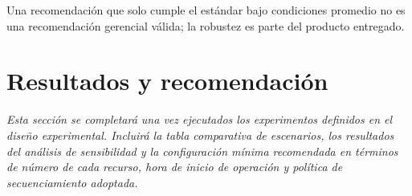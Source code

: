 \documentclass[12pt]{article}
\begin{document}
Una recomendación que solo cumple el estándar bajo condiciones promedio no es una recomendación gerencial válida; la robustez es parte del producto entregado.

\newpage
\section{Resultados y recomendación}

\textit{Esta sección se completará una vez ejecutados los experimentos definidos en el diseño experimental. Incluirá la tabla comparativa de escenarios, los resultados del análisis de sensibilidad y la configuración mínima recomendada en términos de número de cada recurso, hora de inicio de operación y política de secuenciamiento adoptada.}
\end{document}
